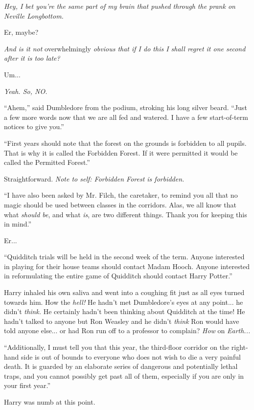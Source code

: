 \emph{Hey, I bet you're the same part of my brain that pushed through the prank on Neville Longbottom.}

Er, maybe?

\emph{And is it not} overwhelmingly \emph{obvious that if I do this I shall regret it one second after it is too late?}

Um...

\emph{Yeah. So, NO.}

``Ahem,'' said Dumbledore from the podium, stroking his long silver beard. ``Just a few more words now that we are all fed and watered. I have a few start-of-term notices to give you.''

``First years should note that the forest on the grounds is forbidden to all pupils. That is why it is called the Forbidden Forest. If it were permitted it would be called the Permitted Forest.''

Straightforward. \emph{Note to self: Forbidden Forest is forbidden.}

``I have also been asked by Mr. Filch, the caretaker, to remind you all that no magic should be used between classes in the corridors. Alas, we all know that what \emph{should be}, and what \emph{is}, are two different things. Thank you for keeping this in mind.''

Er...

``Quidditch trials will be held in the second week of the term. Anyone interested in playing for their house teams should contact Madam Hooch. Anyone interested in reformulating the entire game of Quidditch should contact Harry Potter.''

Harry inhaled his own saliva and went into a coughing fit just as all eyes turned towards him. How the \emph{hell!} He hadn't met Dumbledore's eyes at any point... he didn't \emph{think.} He certainly hadn't been thinking about Quidditch at the time! He hadn't talked to anyone but Ron Weasley and he didn't \emph{think} Ron would have told anyone else... or had Ron run off to a professor to complain? \emph{How} on \emph{Earth...}

``Additionally, I must tell you that this year, the third-floor corridor on the right-hand side is out of bounds to everyone who does not wish to die a very painful death. It is guarded by an elaborate series of dangerous and potentially lethal traps, and you cannot possibly get past all of them, especially if you are only in your first year.''

Harry was numb at this point.

